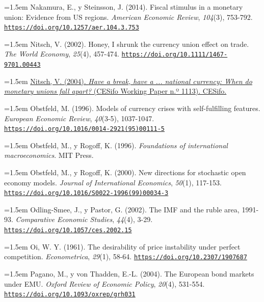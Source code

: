 \documentclass[10pt,a4paper]{article}
\begin{document}
\noindent\hangindent=1.5em Nakamura, E., y Steinsson, J. (2014). Fiscal stimulus in a monetary union: Evidence from US regions. \textit{American Economic Review}, \textit{104}(3), 753-792. \href{https://doi.org/10.1257/aer.104.3.753}{\nolinkurl{https://doi.org/10.1257/aer.104.3.753}}

\noindent\hangindent=1.5em Nitsch, V. (2002). Honey, I shrunk the currency union effect on trade. \textit{The World Economy}, \textit{25}(4), 457-474. \href{https://doi.org/10.1111/1467-9701.00443}{\nolinkurl{https://doi.org/10.1111/1467-9701.00443}}

\noindent\hangindent=1.5em \href{https://www.ifo.de/DocDL/cesifo1_wp1113.pdf}{Nitsch, V. (2004). \textit{Have a break, have a ... national currency: When do monetary unions fall apart?} (CESifo Working Paper n.º 1113). CESifo.}

\noindent\hangindent=1.5em Obstfeld, M. (1996). Models of currency crises with self-fulfilling features. \textit{European Economic Review}, \textit{40}(3-5), 1037-1047. \href{https://doi.org/10.1016/0014-2921(95)00111-5}{\nolinkurl{https://doi.org/10.1016/0014-2921(95)00111-5}}

\noindent\hangindent=1.5em Obstfeld, M., y Rogoff, K. (1996). \textit{Foundations of international macroeconomics}. MIT Press.

\noindent\hangindent=1.5em Obstfeld, M., y Rogoff, K. (2000). New directions for stochastic open economy models. \textit{Journal of International Economics}, \textit{50}(1), 117-153. \href{https://doi.org/10.1016/S0022-1996(99)00034-3}{\nolinkurl{https://doi.org/10.1016/S0022-1996(99)00034-3}}

\noindent\hangindent=1.5em Odling-Smee, J., y Pastor, G. (2002). The IMF and the ruble area, 1991-93. \textit{Comparative Economic Studies}, \textit{44}(4), 3-29. \href{https://doi.org/10.1057/ces.2002.15}{\nolinkurl{https://doi.org/10.1057/ces.2002.15}}

\noindent\hangindent=1.5em Oi, W. Y. (1961). The desirability of price instability under perfect competition. \textit{Econometrica}, \textit{29}(1), 58-64. \href{https://doi.org/10.2307/1907687}{\nolinkurl{https://doi.org/10.2307/1907687}}

\noindent\hangindent=1.5em Pagano, M., y von Thadden, E.-L. (2004). The European bond markets under EMU. \textit{Oxford Review of Economic Policy}, \textit{20}(4), 531-554. \href{https://doi.org/10.1093/oxrep/grh031}{\nolinkurl{https://doi.org/10.1093/oxrep/grh031}}
\end{document}
